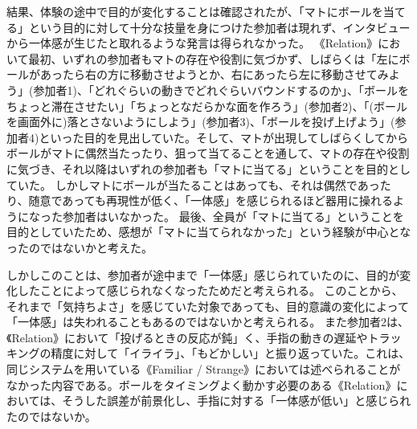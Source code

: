 結果、体験の途中で目的が変化することは確認されたが、「マトにボールを当てる」という目的に対して十分な技量を身につけた参加者は現れず、インタビューから一体感が生じたと取れるような発言は得られなかった。
《Relation》において最初、いずれの参加者もマトの存在や役割に気づかず、しばらくは「左にボールがあったら右の方に移動させようとか、右にあったら左に移動させてみよう」(参加者1)、「どれぐらいの動きでどれぐらいバウンドするのか」、「ボールをちょっと滞在させたい」「ちょっとなだらかな面を作ろう」(参加者2)、「(ボールを画面外に)落とさないようにしよう」(参加者3)、「ボールを投げ上げよう」(参加者4)といった目的を見出していた。そして、マトが出現してしばらくしてからボールがマトに偶然当たったり、狙って当てることを通して、マトの存在や役割に気づき、それ以降はいずれの参加者も「マトに当てる」ということを目的としていた。
しかしマトにボールが当たることはあっても、それは偶然であったり、随意であっても再現性が低く、「一体感」を感じられるほど器用に操れるようになった参加者はいなかった。
最後、全員が「マトに当てる」ということを目的としていたため、感想が「マトに当てられなかった」という経験が中心となったのではないかと考えた。

しかしこのことは、参加者が途中まで「一体感」感じられていたのに、目的が変化したことによって感じられなくなったためだと考えられる。
このことから、それまで「気持ちよさ」を感じていた対象であっても、目的意識の変化によって「一体感」は失われることもあるのではないかと考えられる。
また参加者2は、《Relation》において「投げるときの反応が鈍」く、手指の動きの遅延やトラッキングの精度に対して「イライラ」、「もどかしい」と振り返っていた。これは、同じシステムを用いている《Familiar / Strange》においては述べられることがなかった内容である。ボールをタイミングよく動かす必要のある《Relation》においては、そうした誤差が前景化し、手指に対する「一体感が低い」と感じられたのではないか。

